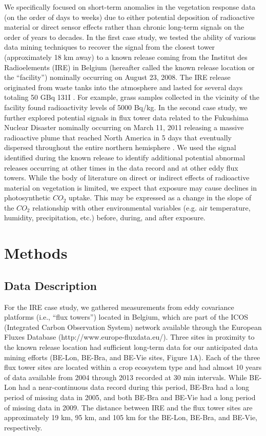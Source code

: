 \documentclass{article}
\begin{document}
We specifically focused on short-term anomalies in the vegetation response data (on the order of days to weeks) due to either potential deposition of radioactive material or direct sensor effects rather than chronic long-term signals on the order of years to decades. In the first case study, we tested the ability of various data mining techniques to recover the signal from the closest tower (approximately 18 km away) to a known release coming from the Institut des Radioelements (IRE) in Belgium (hereafter called the known release location or the “facility”) nominally occurring on August 23, 2008. The IRE release originated from waste tanks into the atmosphere and lasted for several days totaling 50 GBq 131I \citep{carle2010individual}. For example, grass samples collected in the vicinity of the facility found radioactivity levels of 5000 Bq/kg. In the second case study, we further explored potential signals in flux tower data related to the Fukushima Nuclear Disaster nominally occurring on March 11, 2011 releasing a massive radioactive plume that reached North America in 5 days that eventually dispersed throughout the entire northern hemisphere \citep{meszarosPredictabilityDispersionFukushimaderived2016}. We used the signal identified during the known release to identify additional potential abnormal releases occurring at other times in the data record and at other eddy flux towers. While the body of literature on direct or indirect effects of radioactive material on vegetation is limited, we expect that exposure may cause declines in photosynthetic $CO_2$ uptake. This may be expressed as a change in the slope of the $CO_2$ relationship with other environmental variables (e.g. air temperature, humidity, precipitation, etc.) before, during, and after exposure.


\section{Methods}

\subsection{Data Description}

For the IRE case study, we gathered measurements from eddy covariance platforms (i.e., “flux towers”) located in Belgium, which are part of the ICOS (Integrated Carbon Observation System) network available through the European Fluxes Database (http://www.europe-fluxdata.eu/). Three sites in proximity to the known release location had sufficient long-term data for our anticipated data mining efforts (BE-Lon, BE-Bra, and BE-Vie sites, Figure 1A). Each of the three flux tower sites are located within a crop ecosystem type and had almost 10 years of data available from 2004 through 2013 recorded at 30 min intervals. While BE-Lon had a near-continuous data record during this period, BE-Bra had a long period of missing data in 2005, and both BE-Bra and BE-Vie had a long period of missing data in 2009. The distance between IRE and the flux tower sites are approximately 19 km, 95 km, and 105 km for the BE-Lon, BE-Bra, and BE-Vie, respectively.
\end{document}
